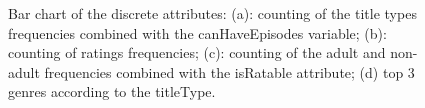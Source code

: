 \begin{figure}[h!]
    \centering
    \caption{Bar chart of the discrete attributes: (a): counting of the title
    types frequencies combined with the canHaveEpisodes variable;
    (b): counting of ratings frequencies;
    (c): counting of the adult and non-adult frequencies combined with the
    isRatable attribute;
    (d) top 3 genres according to the titleType.}
    \label{fig:bar-charts}
\end{figure}


